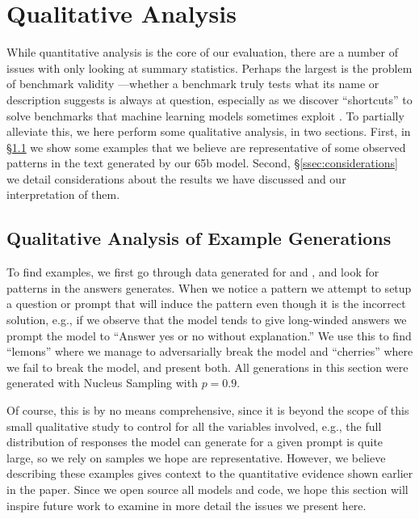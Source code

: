 \section{Qualitative Analysis}

While quantitative analysis is the core of our evaluation, there are a number of issues with only looking at summary statistics. Perhaps the largest is the problem of benchmark validity \citep{liao2021we}—whether a benchmark truly tests what its name or description suggests is always at question, especially as we discover ``shortcuts'' to solve benchmarks that machine learning models sometimes exploit \citep{gururangan2018annotation, poliak2018hypothesis}. To partially alleviate this, we here perform some qualitative analysis, in two sections. First, in \S\ref{ssec:examples} we show some examples that we believe are representative of some observed patterns in the text generated by our 65b \model model. Second, \S\ref{ssec:considerations} we detail considerations about the results we have discussed and our interpretation of them.

\subsection{Qualitative Analysis of Example Generations}
\label{ssec:examples}

To find examples, we first go through data generated for \benchv and \benchoa, and look for patterns in the answers \model generates. When we notice a pattern we attempt to setup a question or prompt that will induce the pattern even though it is the incorrect solution, e.g., if we observe that the model tends to give long-winded answers we prompt the model to ``Answer yes or no without explanation.'' We use this to find ``lemons'' where we manage to adversarially break the model and ``cherries'' where we fail to break the model, and present both. All generations in this section were generated with Nucleus Sampling \cite{holtzmancurious} with $p=0.9$.

Of course, this is by no means comprehensive, since it is beyond the scope of this small qualitative study to control for all the variables involved, e.g., the full distribution of responses the model can generate for a given prompt is quite large, so we rely on samples we hope are representative. However, we believe describing these examples gives context to the quantitative evidence shown earlier in the paper. Since we open source all models and code, we hope this section will inspire future work to examine in more detail the issues we present here.
